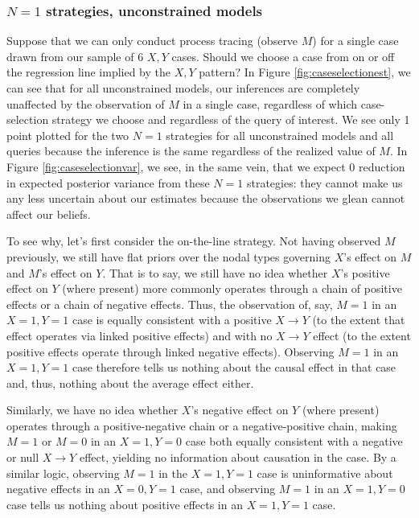 \documentclass[
  12pt,
]{book}
\begin{document}
\hypertarget{n1-strategies-unconstrained-models}{%
\subsubsection{\texorpdfstring{\(N=1\) strategies, unconstrained models}{N=1 strategies, unconstrained models}}\label{n1-strategies-unconstrained-models}}

Suppose that we can only conduct process tracing (observe \(M\)) for a single case drawn from our sample of 6 \(X,Y\) cases. Should we choose a case from on or off the regression line implied by the \(X,Y\) pattern? In Figure \ref{fig:caseselectionest}, we can see that for all unconstrained models, our inferences are completely unaffected by the observation of \(M\) in a single case, regardless of which case-selection strategy we choose and regardless of the query of interest. We see only 1 point plotted for the two \(N=1\) strategies for all unconstrained models and all queries because the inference is the same regardless of the realized value of \(M\). In Figure \ref{fig:caseselectionvar}, we see, in the same vein, that we expect 0 reduction in expected posterior variance from these \(N=1\) strategies: they cannot make us any less uncertain about our estimates because the observations we glean cannot affect our beliefs.

To see why, let's first consider the on-the-line strategy. Not having observed \(M\) previously, we still have flat priors over the nodal types governing \(X\)'s effect on \(M\) and \(M\)'s effect on \(Y\). That is to say, we still have no idea whether \(X\)'s positive effect on \(Y\) (where present) more commonly operates through a chain of positive effects or a chain of negative effects. Thus, the observation of, say, \(M=1\) in an \(X=1, Y=1\) case is equally consistent with a positive \(X \rightarrow Y\) (to the extent that effect operates via linked positive effects) and with no \(X \rightarrow Y\) effect (to the extent positive effects operate through linked negative effects). Observing \(M=1\) in an \(X=1, Y=1\) case therefore tells us nothing about the causal effect in that case and, thus, nothing about the average effect either.

Similarly, we have no idea whether \(X\)'s negative effect on \(Y\) (where present) operates through a positive-negative chain or a negative-positive chain, making \(M=1\) or \(M=0\) in an \(X=1, Y=0\) case both equally consistent with a negative or null \(X \rightarrow Y\) effect, yielding no information about causation in the case. By a similar logic, observing \(M=1\) in the \(X=1, Y=1\) case is uninformative about negative effects in an \(X=0, Y=1\) case, and observing \(M=1\) in an \(X=1, Y=0\) case tells us nothing about positive effects in an \(X=1, Y=1\) case.
\end{document}
